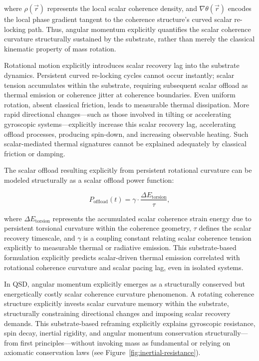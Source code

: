 \documentclass[preprints,article,submit,pdftex,moreauthors]{Definitions/mdpi}
\begin{document}
where \(\rho(\vec{r})\) represents the local scalar coherence density, and \(\nabla\theta(\vec{r})\) encodes the local phase gradient tangent to the coherence structure’s curved scalar re-locking path. Thus, angular momentum explicitly quantifies the scalar coherence curvature structurally sustained by the substrate, rather than merely the classical kinematic property of mass rotation.

Rotational motion explicitly introduces scalar recovery lag into the substrate dynamics. Persistent curved re-locking cycles cannot occur instantly; scalar tension accumulates within the substrate, requiring subsequent scalar offload as thermal emission or coherence jitter at coherence boundaries. Even uniform rotation, absent classical friction, leads to measurable thermal dissipation. More rapid directional changes—such as those involved in tilting or accelerating gyroscopic systems—explicitly increase this scalar recovery lag, accelerating offload processes, producing spin-down, and increasing observable heating. Such scalar-mediated thermal signatures cannot be explained adequately by classical friction or damping.

The scalar offload resulting explicitly from persistent rotational curvature can be modeled structurally as a scalar offload power function:

\[
P_{\text{offload}}(t) = \gamma \cdot \frac{\Delta E_{\text{torsion}}}{\tau},
\]

where \(\Delta E_{\text{torsion}}\) represents the accumulated scalar coherence strain energy due to persistent torsional curvature within the coherence geometry, \(\tau\) defines the scalar recovery timescale, and \(\gamma\) is a coupling constant relating scalar coherence tension explicitly to measurable thermal or radiative emission. This substrate-based formulation explicitly predicts scalar-driven thermal emission correlated with rotational coherence curvature and scalar pacing lag, even in isolated systems.

In QSD, angular momentum explicitly emerges as a structurally conserved but energetically costly scalar coherence curvature phenomenon. A rotating coherence structure explicitly invests scalar curvature memory within the substrate, structurally constraining directional changes and imposing scalar recovery demands. This substrate-based reframing explicitly explains gyroscopic resistance, spin decay, inertial rigidity, and angular momentum conservation structurally—from first principles—without invoking mass as fundamental or relying on axiomatic conservation laws (see Figure~\ref{fig:inertial-resistance}).
\end{document}
